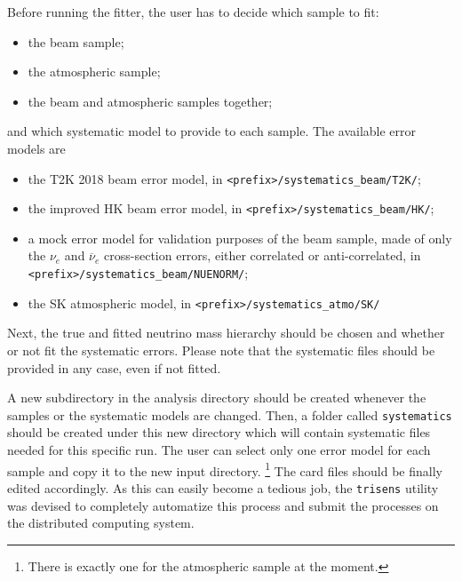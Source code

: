 \documentclass[a4paper, 11pt]{article}
\newcommand{\cj}{\overline}
\begin{document}
Before running the fitter, the user has to decide which sample to fit:
\begin{itemize}
	\item the beam sample;
	\item the atmospheric sample;
	\item the beam and atmospheric samples together;
\end{itemize}
and which systematic model to provide to each sample.
The available error models are
\begin{itemize}
	\small
	\item the T2K 2018 beam error model, in \texttt{<prefix>/systematics\_beam/T2K/};
	\item the improved HK beam error model, in \texttt{<prefix>/systematics\_beam/HK/};
	\item a mock error model for validation purposes of the beam sample, %
		made of only the $\nu_e$ and $\cj{\nu}_e$ %
		cross-section errors, either correlated or anti-correlated, %
		in \texttt{<prefix>/systematics\_beam/NUENORM/};
	\item the SK atmospheric model, in \texttt{<prefix>/systematics\_atmo/SK/}
\end{itemize}
Next, the true and fitted neutrino mass hierarchy should be chosen and whether or not %
fit the systematic errors.
Please note that the systematic files should be provided in any case, even if not fitted.

A new subdirectory in the analysis directory should be created whenever the samples or %
the systematic models are changed.
Then, a folder called \texttt{systematics} should be created under this new directory %
which will contain systematic files needed for this specific run.
The user can select only one error model for each sample and copy it to the new input directory.%
\footnote{There is exactly one for the atmospheric sample at the moment.}
The card files should be finally edited accordingly.
As this can easily become a tedious job, the \texttt{trisens} utility was devised to %
completely automatize this process and submit the processes on the distributed computing system.
\end{document}
